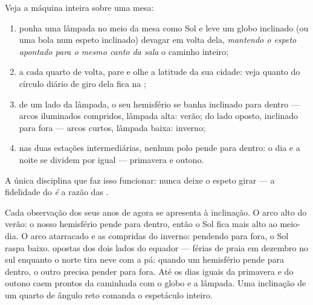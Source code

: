 \begin{method}\label{met:g6:sun-earth-moon:globe}
Veja a máquina inteira sobre uma mesa:
\begin{enumerate}
  \item ponha uma lâmpada no meio da mesa como Sol e leve um globo
        inclinado (ou uma bola num espeto inclinado) devagar em volta
        dela, \emph{mantendo o espeto apontado para o mesmo canto da
        sala} o caminho inteiro;
  \item a cada quarto de volta, pare e olhe a latitude da sua cidade:
        veja quanto do círculo diário de giro dela fica na ;
  \item de um lado da lâmpada, o seu hemisfério se banha inclinado
        para dentro --- arcos iluminados compridos, lâmpada alta:
        verão; do lado oposto, inclinado para fora --- arcos curtos,
        lâmpada baixa: inverno;
  \item nas duas estações intermediárias, nenhum polo pende para
        dentro: o dia e a noite se dividem por igual --- primavera e
        outono.
\end{enumerate}
A única disciplina que faz isso funcionar: nunca deixe o espeto
girar --- a fidelidade do  \emph{é} a razão das .
\end{method}

\begin{example}\label{ex:g6:sun-earth-moon:clues}
Cada observação dos seus anos de  agora se apresenta à
inclinação. O arco alto do verão: o nosso hemisfério pende para
dentro, então o Sol fica mais alto ao meio-dia. O arco atarracado e
as  compridas do inverno: pendendo para fora, o Sol raspa
baixo.  opostas dos dois lados do equador --- férias de praia
em dezembro no sul enquanto o norte tira neve com a pá: quando um
hemisfério pende para dentro, o outro precisa pender para fora. Até
os dias iguais da primavera e do outono caem prontos da caminhada com
o globo e a lâmpada. Uma inclinação de um quarto de ângulo reto
comanda o espetáculo inteiro.
\end{example}

